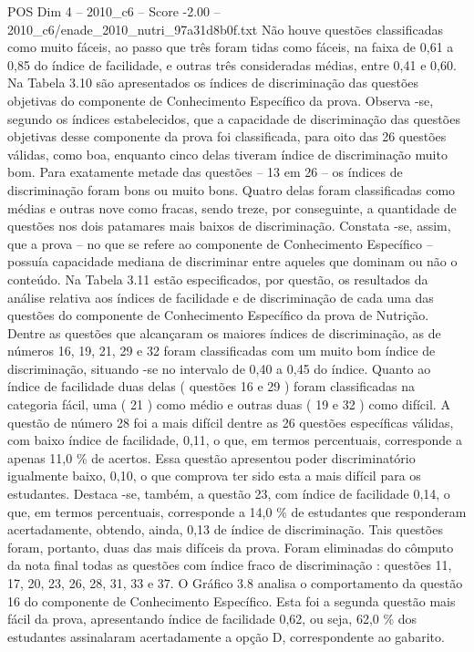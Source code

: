 \begin{textsample}{POS Dim 4 – 2010\_c6 – Score -2.00 – 2010\_c6/enade\_2010\_nutri\_97a31d8b0f.txt}
Não houve questões classificadas como muito fáceis, ao passo que três foram tidas como fáceis, na faixa de 0,61 a 0,85 do índice de facilidade, e outras três consideradas médias, entre 0,41 e 0,60.
Na Tabela 3.10 são apresentados os índices de discriminação das questões objetivas do componente de Conhecimento Específico da prova.
Observa -se, segundo os índices estabelecidos, que a capacidade de discriminação das questões objetivas desse componente da prova foi classificada, para oito das 26 questões válidas, como boa, enquanto cinco delas tiveram índice de discriminação muito bom.
Para exatamente metade das questões – 13 em 26 – os índices de discriminação foram bons ou muito bons.
Quatro delas foram classificadas como médias e outras nove como fracas, sendo treze, por conseguinte, a quantidade de questões nos dois patamares mais baixos de discriminação.
Constata -se, assim, que a prova – no que se refere ao componente de Conhecimento Específico – possuía capacidade mediana de discriminar entre aqueles que dominam ou não o conteúdo.
Na Tabela 3.11 estão especificados, por questão, os resultados da análise relativa aos índices de facilidade e de discriminação de cada uma das questões do componente de Conhecimento Específico da prova de Nutrição.
Dentre as questões que alcançaram os maiores índices de discriminação, as de números 16, 19, 21, 29 e 32 foram classificadas com um muito bom índice de discriminação, situando -se no intervalo de 0,40 a 0,45 do índice.
Quanto ao índice de facilidade duas delas ( questões 16 e 29 ) foram classificadas na categoria fácil, uma ( 21 ) como médio e outras duas ( 19 e 32 ) como difícil.
A questão de número 28 foi a mais difícil dentre as 26 questões específicas válidas, com baixo índice de facilidade, 0,11, o que, em termos percentuais, corresponde a apenas 11,0 \% de acertos.
Essa questão apresentou poder discriminatório igualmente baixo, 0,10, o que comprova ter sido esta a mais difícil para os estudantes.
Destaca -se, também, a questão 23, com índice de facilidade 0,14, o que, em termos percentuais, corresponde a 14,0 \% de estudantes que responderam acertadamente, obtendo, ainda, 0,13 de índice de discriminação.
Tais questões foram, portanto, duas das mais difíceis da prova.
Foram eliminadas do cômputo da nota final todas as questões com índice fraco de discriminação : questões 11, 17, 20, 23, 26, 28, 31, 33 e 37.
O Gráfico 3.8 analisa o comportamento da questão 16 do componente de Conhecimento Específico.
Esta foi a segunda questão mais fácil da prova, apresentando índice de facilidade 0,62, ou seja, 62,0 \% dos estudantes assinalaram acertadamente a opção D, correspondente ao gabarito.

\end{textsample}
